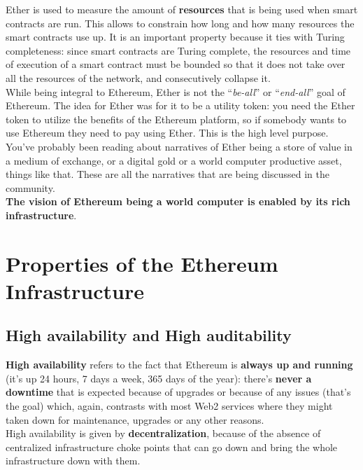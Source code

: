 Ether is used to measure the amount of \textbf{resources} that is being used when smart contracts are run.
This allows to constrain how long and how many resources the smart contracts use up.
It is an important property because it ties with Turing completeness: since smart contracts are Turing complete, the resources and time of execution of a smart contract must be bounded so that it does not take over all the resources of the network, and consecutively collapse it.\\

While being integral to Ethereum, Ether is not the ``\textit{be-all}'' or ``\textit{end-all}'' goal of Ethereum.
The idea for Ether was for it to be a utility token: you need the Ether token to utilize the benefits of the Ethereum platform, so if somebody wants to use Ethereum they need to pay using Ether.
This is the high level purpose.\\

You've probably been reading about narratives of Ether being a store of value in a medium of exchange, or a digital gold or a world computer productive asset, things like that. These are all the narratives that are being discussed in the community.\\

\textbf{The vision of Ethereum being a world computer is enabled by its rich infrastructure}.

\section{Properties of the Ethereum Infrastructure}

\subsection*{High availability and High auditability}

\textbf{High availability} refers to the fact that Ethereum is \textbf{always up and running} (it's up 24 hours, 7 days a week, 365 days of the year): there's \textbf{never a downtime} that is expected because of upgrades or because of any issues (that's the goal) which, again, contrasts with most Web2 services where they might taken down for maintenance, upgrades or any other reasons.\\

High availability is given by \textbf{decentralization}, because of the absence of centralized infrastructure choke points that can go down and bring the whole infrastructure down with them.

